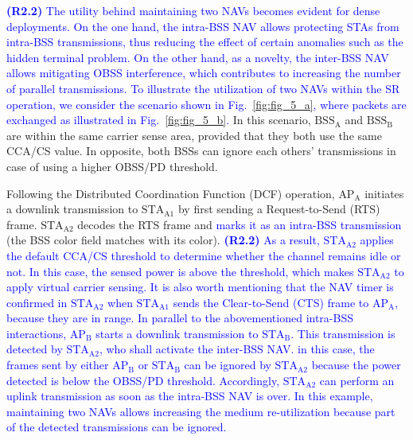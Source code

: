 \documentclass{ieeeaccess}
\begin{document}
\textcolor{blue}{\textbf{(R2.2)} The utility behind maintaining two NAVs becomes evident for dense deployments. On the one hand, the intra-BSS NAV allows protecting STAs from intra-BSS transmissions, thus reducing the effect of certain anomalies such as the hidden terminal problem. On the other hand, as a novelty, the inter-BSS NAV allows mitigating OBSS interference, which contributes to increasing the number of parallel transmissions. To illustrate the utilization of two NAVs within the SR operation, we consider the scenario shown in Fig.~\ref{fig:fig_5_a}, where packets are exchanged as illustrated in Fig.~\ref{fig:fig_5_b}.} In this scenario, $\text{BSS}_\text{A}$ and $\text{BSS}_\text{B}$ are within the same carrier sense area, provided that they both use the same CCA/CS value. In opposite, both BSSs can ignore each others' transmissions in case of using a higher OBSS/PD threshold.

Following the Distributed Coordination Function (DCF) operation, $\text{AP}_\text{A}$ initiates a downlink transmission to $\text{STA}_\text{A1}$ by first sending a Request-to-Send (RTS) frame. $\text{STA}_\text{A2}$ decodes the RTS frame and \textcolor{blue}{marks it as an intra-BSS transmission} (the BSS color field matches with its color). \textcolor{blue}{\textbf{(R2.2)} As a result, $\text{STA}_\text{A2}$ applies the default CCA/CS threshold to determine whether the channel remains idle or not. In this case, the sensed power is above the threshold, which makes $\text{STA}_\text{A2}$ to apply virtual carrier sensing. It is also worth mentioning that the NAV timer is confirmed in $\text{STA}_\text{A2}$ when $\text{STA}_\text{A1}$ sends the Clear-to-Send (CTS) frame to $\text{AP}_\text{A}$, because they are in range. In parallel to the abovementioned intra-BSS interactions, $\text{AP}_\text{B}$ starts a downlink transmission to $\text{STA}_\text{B}$. This transmission is detected by $\text{STA}_\text{A2}$, who shall activate the inter-BSS NAV. in this case, the frames sent by either $\text{AP}_\text{B}$ or $\text{STA}_\text{B}$ can be ignored by $\text{STA}_\text{A2}$ because the power detected is below the OBSS/PD threshold. Accordingly, $\text{STA}_\text{A2}$ can perform an uplink transmission as soon as the intra-BSS NAV is over. In this example, maintaining two NAVs allows increasing the medium re-utilization because part of the detected transmissions can be ignored.}

\end{document}
